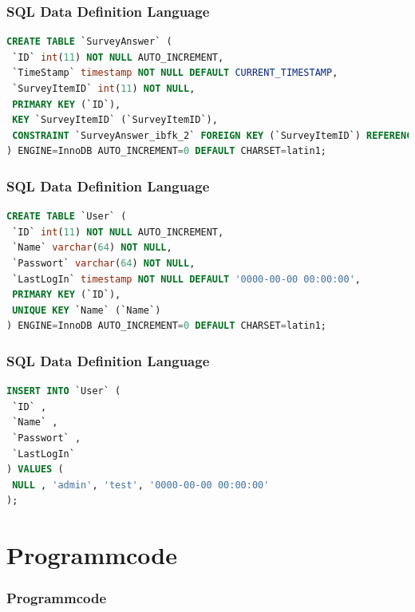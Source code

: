\documentclass[xcolor=dvipsnames]{beamer}
\begin{document}
\begin{frame}[fragile] %
\frametitle{SQL Data Definition Language} %
\begin{lstlisting}[language=SQL, caption=database.sql]
CREATE TABLE `SurveyAnswer` (
 `ID` int(11) NOT NULL AUTO_INCREMENT,
 `TimeStamp` timestamp NOT NULL DEFAULT CURRENT_TIMESTAMP,
 `SurveyItemID` int(11) NOT NULL,
 PRIMARY KEY (`ID`),
 KEY `SurveyItemID` (`SurveyItemID`),
 CONSTRAINT `SurveyAnswer_ibfk_2` FOREIGN KEY (`SurveyItemID`) REFERENCES `SurveyItems` (`ID`) ON DELETE CASCADE ON UPDATE CASCADE
) ENGINE=InnoDB AUTO_INCREMENT=0 DEFAULT CHARSET=latin1;
\end{lstlisting} 
\end{frame}


\begin{frame}[fragile] %
\frametitle{SQL Data Definition Language} %
\begin{lstlisting}[language=SQL, caption=database.sql]
CREATE TABLE `User` (
 `ID` int(11) NOT NULL AUTO_INCREMENT,
 `Name` varchar(64) NOT NULL,
 `Passwort` varchar(64) NOT NULL,
 `LastLogIn` timestamp NOT NULL DEFAULT '0000-00-00 00:00:00',
 PRIMARY KEY (`ID`),
 UNIQUE KEY `Name` (`Name`)
) ENGINE=InnoDB AUTO_INCREMENT=0 DEFAULT CHARSET=latin1;
\end{lstlisting} 
\end{frame}

\begin{frame}[fragile] %
\frametitle{SQL Data Definition Language} %
\begin{lstlisting}[language=SQL, caption=database.sql]
INSERT INTO `User` (
 `ID` ,
 `Name` ,
 `Passwort` ,
 `LastLogIn`
) VALUES (
 NULL , 'admin', 'test', '0000-00-00 00:00:00'
);
\end{lstlisting} 
\end{frame}


\section{Programmcode}
\begin{frame}[shrink] %
  \frametitle{Programmcode} %

\end{frame}
\end{document}
